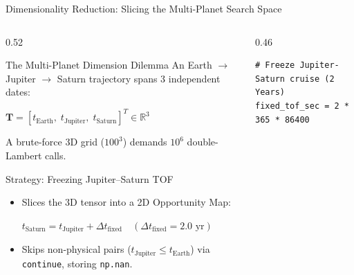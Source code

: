 \documentclass[aspectratio=169, 10pt]{beamer}
\begin{document}
\begin{frame}[fragile]{Dimensionality Reduction: Slicing the Multi-Planet Search Space}
    \begin{columns}[t]
        \begin{column}{0.52\textwidth}
            \begin{block}{The Multi-Planet Dimension Dilemma}
                \scriptsize
                An Earth $\to$ Jupiter $\to$ Saturn trajectory spans 3 independent dates:
                \par\vspace{2pt}
                {\centering $\mathbf{T} = [t_{\text{Earth}}, \; t_{\text{Jupiter}}, \; t_{\text{Saturn}}]^T \in \mathbb{R}^3$\par}
                \vspace{2pt}
                A brute-force 3D grid ($100^3$) demands $10^6$ double-Lambert calls.
            \end{block}
            \vspace{-0.08cm}
            \begin{alertblock}{Strategy: Freezing Jupiter--Saturn TOF}
                \scriptsize
                \begin{itemize}\setlength{\itemsep}{1pt}\setlength{\topsep}{0pt}
                    \item Slices the 3D tensor into a 2D Opportunity Map:
                    \par\vspace{1pt}
                    {\centering $t_{\text{Saturn}} = t_{\text{Jupiter}} + \Delta t_{\text{fixed}} \quad (\Delta t_{\text{fixed}} = 2.0\text{ yr})$\par}
                    \vspace{1pt}
                    \item Skips non-physical pairs ($t_{\text{Jupiter}} \le t_{\text{Earth}}$) via \texttt{continue}, storing \texttt{np.nan}.
                \end{itemize}
            \end{alertblock}
        \end{column}

        \begin{column}{0.46\textwidth}
\begin{lstlisting}[style=pythoncode]
# Freeze Jupiter-Saturn cruise (2 Years)
fixed_tof_sec = 2 * 365 * 86400


\end{lstlisting}
\end{column}
\end{columns}
\end{frame}
\end{document}
